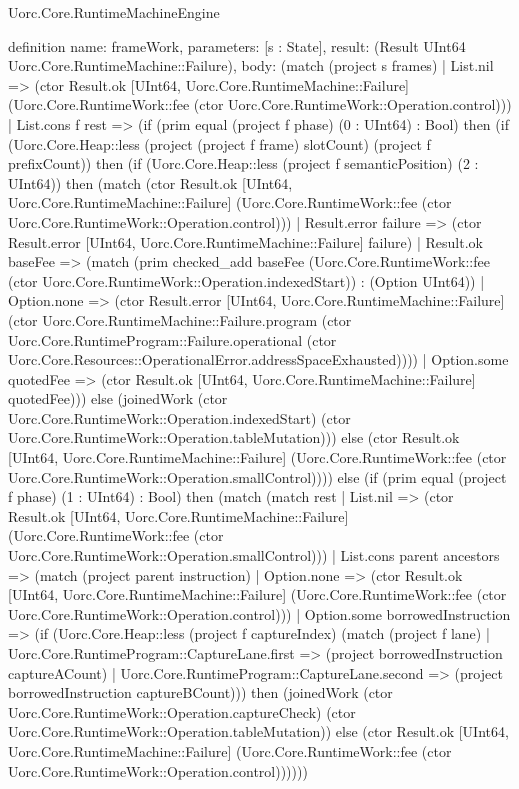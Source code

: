 \begin{lexlean}{Uorc.Core.RuntimeMachineEngine}
\begin{semanticmodule}
definition{
  name: frameWork,
  parameters: [s : State],
  result: (Result UInt64 Uorc.Core.RuntimeMachine::Failure),
  body: (match (project s frames)
    | List.nil => (ctor Result.ok [UInt64, Uorc.Core.RuntimeMachine::Failure] (Uorc.Core.RuntimeWork::fee (ctor Uorc.Core.RuntimeWork::Operation.control)))
    | List.cons f rest => (if (prim equal (project f phase) (0 : UInt64) : Bool) then (if (Uorc.Core.Heap::less (project (project f frame) slotCount) (project f prefixCount)) then (if (Uorc.Core.Heap::less (project f semanticPosition) (2 : UInt64)) then (match (ctor Result.ok [UInt64, Uorc.Core.RuntimeMachine::Failure] (Uorc.Core.RuntimeWork::fee (ctor Uorc.Core.RuntimeWork::Operation.control)))
      | Result.error failure => (ctor Result.error [UInt64, Uorc.Core.RuntimeMachine::Failure] failure)
      | Result.ok baseFee => (match (prim checked_add baseFee (Uorc.Core.RuntimeWork::fee (ctor Uorc.Core.RuntimeWork::Operation.indexedStart)) : (Option UInt64))
        | Option.none => (ctor Result.error [UInt64, Uorc.Core.RuntimeMachine::Failure] (ctor Uorc.Core.RuntimeMachine::Failure.program (ctor Uorc.Core.RuntimeProgram::Failure.operational (ctor Uorc.Core.Resources::OperationalError.addressSpaceExhausted))))
        | Option.some quotedFee => (ctor Result.ok [UInt64, Uorc.Core.RuntimeMachine::Failure] quotedFee))) else (joinedWork (ctor Uorc.Core.RuntimeWork::Operation.indexedStart) (ctor Uorc.Core.RuntimeWork::Operation.tableMutation))) else (ctor Result.ok [UInt64, Uorc.Core.RuntimeMachine::Failure] (Uorc.Core.RuntimeWork::fee (ctor Uorc.Core.RuntimeWork::Operation.smallControl)))) else (if (prim equal (project f phase) (1 : UInt64) : Bool) then (match (match rest
        | List.nil => (ctor Result.ok [UInt64, Uorc.Core.RuntimeMachine::Failure] (Uorc.Core.RuntimeWork::fee (ctor Uorc.Core.RuntimeWork::Operation.smallControl)))
        | List.cons parent ancestors => (match (project parent instruction)
          | Option.none => (ctor Result.ok [UInt64, Uorc.Core.RuntimeMachine::Failure] (Uorc.Core.RuntimeWork::fee (ctor Uorc.Core.RuntimeWork::Operation.control)))
          | Option.some borrowedInstruction => (if (Uorc.Core.Heap::less (project f captureIndex) (match (project f lane)
            | Uorc.Core.RuntimeProgram::CaptureLane.first => (project borrowedInstruction captureACount)
            | Uorc.Core.RuntimeProgram::CaptureLane.second => (project borrowedInstruction captureBCount))) then (joinedWork (ctor Uorc.Core.RuntimeWork::Operation.captureCheck) (ctor Uorc.Core.RuntimeWork::Operation.tableMutation)) else (ctor Result.ok [UInt64, Uorc.Core.RuntimeMachine::Failure] (Uorc.Core.RuntimeWork::fee (ctor Uorc.Core.RuntimeWork::Operation.control))))))
}
\end{semanticmodule}
\end{lexlean}
